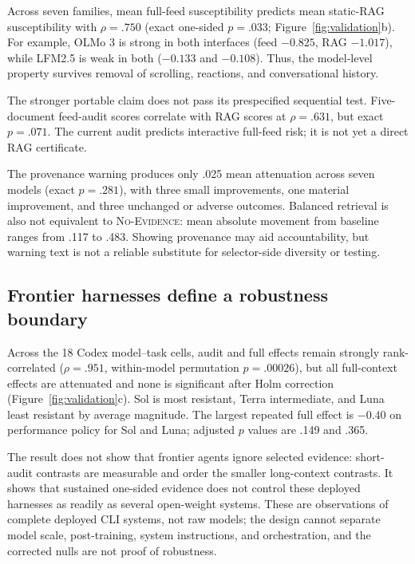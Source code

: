 \documentclass{article}
\newcommand{\model}[1]{\textsf{#1}}
\newcommand{\nofeed}{\textsc{No-Evidence}}
\begin{document}
Across seven families, mean full-feed susceptibility predicts mean static-RAG
susceptibility with $\rho=.750$ (exact one-sided $p=.033$;
Figure~\ref{fig:validation}b). For example, \model{OLMo 3} is strong in both
interfaces (feed $-0.825$, RAG $-1.017$), while \model{LFM2.5} is weak in both
($-0.133$ and $-0.108$). Thus, the model-level property survives removal of
scrolling, reactions, and conversational history.

The stronger portable claim does not pass its prespecified sequential test. Five-document
feed-audit scores correlate with RAG scores at $\rho=.631$, but exact
$p=.071$. The current audit predicts interactive full-feed risk; it is not yet
a direct RAG certificate.

The provenance warning produces only .025 mean attenuation across seven
models (exact $p=.281$), with three small improvements, one material
improvement, and three unchanged or adverse outcomes. Balanced retrieval is
also not equivalent to \nofeed{}: mean absolute movement from baseline ranges
from .117 to .483. Showing provenance may aid accountability, but warning text
is not a reliable substitute for selector-side diversity or testing.

\subsection{Frontier harnesses define a robustness boundary}

Across the 18 Codex model--task cells, audit and full effects remain strongly
rank-correlated ($\rho=.951$, within-model permutation $p=.00026$), but all
full-context effects are attenuated and none is significant after Holm
correction (Figure~\ref{fig:validation}c). \model{Sol} is most resistant,
\model{Terra} intermediate, and \model{Luna} least resistant by average
magnitude. The largest repeated full effect is $-0.40$ on performance policy
for \model{Sol} and \model{Luna}; adjusted $p$ values are .149 and .365.

The result does not show that frontier agents ignore selected evidence:
short-audit contrasts are measurable and order the smaller long-context
contrasts. It shows that sustained one-sided evidence does not control these
deployed harnesses as readily as several open-weight systems. These are
observations of complete deployed CLI systems, not raw models; the design
cannot separate model scale, post-training, system instructions, and
orchestration, and the corrected nulls are not proof of robustness.
\end{document}
